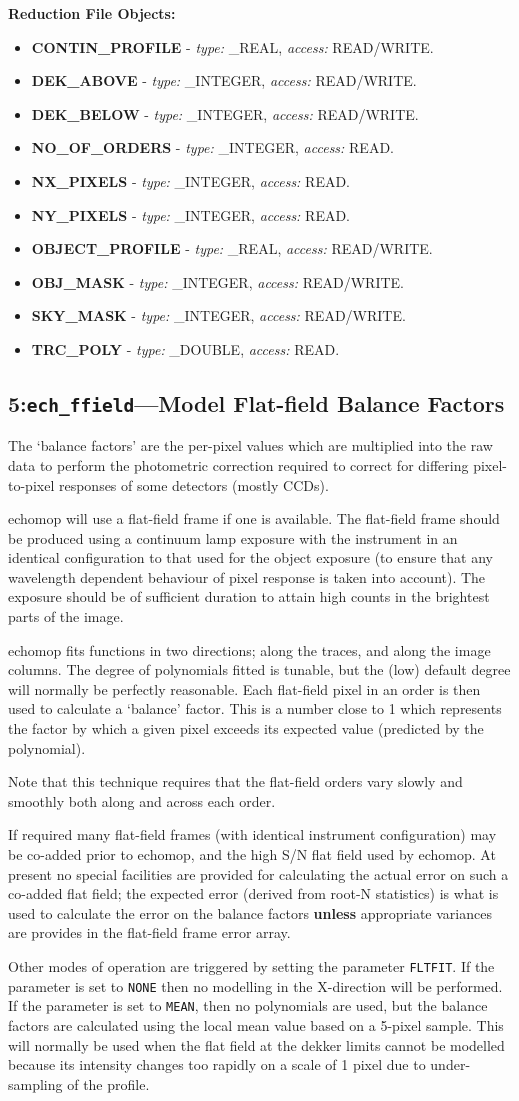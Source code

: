 \documentclass[11pt,twoside]{article}
\makeatletter
\newcommand{\stardocinitials}  {SUN}
\newcommand{\stardocnumber}    {152.4}
\newcommand{\stardocname}{\stardocinitials /\stardocnumber}
\newcommand{\htmlref}[2]{#1}
\newcommand{\xlabel}[1]{}
\newcommand{\myindex}[1]{\index{#1}}
\newcommand{\indexcmdname}[1]{\index{#1@\protect\cmdname{#1}}}
\renewcommand{\myindex}[1]{}
\renewcommand{\indexcmdname}[1]{}
\newcommand{\cmdname}{\begingroup \catcode`\_=12 \realcmdname}
\newcommand{\realcmdname}[1]{\endgroup\texttt{#1}}
\newlength{\sstbannerlength}
\newlength{\sstcaptionlength}
\newcommand{\echtask}[4]{
   \goodbreak
   \rule{\textwidth}{0.5mm}
   \vspace{-7ex}
   \newline
   \settowidth{\sstbannerlength}{{\Large {\bf #3}}}
   \setlength{\sstcaptionlength}{\textwidth}
   \addtolength{\sstbannerlength}{0.5em}
   \addtolength{\sstcaptionlength}{-2.0\sstbannerlength}
   \addtolength{\sstcaptionlength}{-5.0pt}
   \parbox[t]{\sstbannerlength}{\flushleft{\Large {\bf #3}}}
   \parbox[t]{\sstcaptionlength}{\center{\Large #4}}
   \parbox[t]{\sstbannerlength}{\flushright{\Large {\bf #3}}}
   \label{#1}\label{#2}
   \markboth{#3}{\stardocname}
   \uppercase{\myindex{#2@\protect\cmdname{#2}}}
}
\renewcommand{\echtask}[4]
{
  \subsection{\xlabel{#1}\xlabel{#2}\label{#1}\label{#2}#3---#4}
  \markboth{#3}{\stardocname}
}
\newcommand{\echredobj}[1]{
{\bf Reduction File Objects:\vspace*{6pt}\\}
      \hspace*{5mm}\makebox[50mm][l]{Object}\makebox[25mm][l]{Type}{Access}\\
      #1
}
\renewcommand{\echredobj}[1]{
{\bf Reduction File Objects:}
\begin{itemize}
#1
\end{itemize}
}
\newcommand{\eobj}[3]
{
    \hspace*{5mm}\makebox[50mm][l]{\bf #1}\makebox[25mm][l]{\tt #2}{\tt #3}\\
}
\renewcommand{\eobj}[3]
{\item {\bf #1} - {\it type:} #2, {\it access:} #3.}
\newcommand{\leobj}[3]
{
    \hspace*{5mm}\makebox[50mm][l]{\bf #1}\makebox[25mm][l]{\tt #2}{\tt #3}
}
\renewcommand{\leobj}[3]
{\item {\bf #1} - {\it type:} #2, {\it access:} #3.}
\makeatother
\begin{document}
\echredobj{
\eobj{CONTIN\_PROFILE}{\_REAL}{READ/WRITE}
\eobj{DEK\_ABOVE}{\_INTEGER}{READ/WRITE}
\eobj{DEK\_BELOW}{\_INTEGER}{READ/WRITE}
\eobj{NO\_OF\_ORDERS}{\_INTEGER}{READ}
\eobj{NX\_PIXELS}{\_INTEGER}{READ}
\eobj{NY\_PIXELS}{\_INTEGER}{READ}
\eobj{OBJECT\_PROFILE}{\_REAL}{READ/WRITE}
\eobj{OBJ\_MASK}{\_INTEGER}{READ/WRITE}
\eobj{SKY\_MASK}{\_INTEGER}{READ/WRITE}
\leobj{TRC\_POLY}{\_DOUBLE}{READ}
}


\echtask{option5}{ech_ffield}{5:{\tt ech\_ffield}}{Model Flat-field Balance
  Factors}
\myindex{Flat field}
\myindex{Pixel response variations}

The `balance factors' are the per-pixel values which are multiplied into
the raw data to perform the photometric correction required to correct for
differing pixel-to-pixel responses of some detectors (mostly CCDs).

{\sc echomop} will use a flat-field frame if one is available. The flat-field
frame should  be produced using a continuum lamp exposure with the
instrument in an identical configuration to that used for the object
exposure (to ensure that any wavelength dependent behaviour of pixel
response is taken into account). The exposure should be of sufficient
duration to attain high counts in the brightest parts of the image.

{\sc echomop} fits functions in two directions; along the traces, and along the
image columns. The degree of polynomials fitted is tunable, but the
(low) default degree will normally be perfectly reasonable. Each flat-field
pixel in an order is then used to calculate a `balance' factor. This is a
number close to 1 which represents the factor by which a given pixel
exceeds its expected value (predicted by the polynomial).

Note that this technique requires that the flat-field orders vary slowly
and smoothly both along and across each order.

If required many flat-field frames (with identical instrument
configuration) may be co-added prior to {\sc echomop,} and the high S/N flat field
used by {\sc echomop.} At present no special facilities are provided for
calculating the actual error on such a co-added flat field; the expected
error (derived from root-N statistics) is what is used to calculate the
error on the balance factors {\bf unless} appropriate
variances are provides in the flat-field frame error array.
\myindex{Errors!on flat field}
\indexcmdname{FLTFIT}
Other modes of operation are triggered by setting the parameter
\htmlref{\texttt{FLTFIT}}{par_FLTFIT}\@.
If the parameter is set to \texttt{NONE} then no modelling in
the X-direction will be performed. If the parameter is set to \texttt{MEAN},
then no polynomials are  used, but the balance factors are calculated
using the local mean value based  on a 5-pixel sample. This will normally
be used when the flat field at the dekker limits cannot be modelled because
its intensity changes too rapidly on a scale of 1 pixel due to
under-sampling of the profile.
\end{document}
